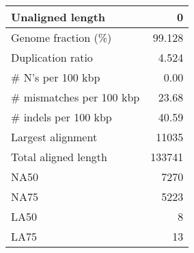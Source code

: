 \documentclass[12pt,a4paper]{article}
\begin{document}
\begin{table}[ht]
\begin{center}
\begin{tabular}{|l*{1}{|r}|}
Unaligned length & 0 \\ \hline
Genome fraction (\%) & 99.128 \\ \hline
Duplication ratio & 4.524 \\ \hline
\# N's per 100 kbp & 0.00 \\ \hline
\# mismatches per 100 kbp & 23.68 \\ \hline
\# indels per 100 kbp & 40.59 \\ \hline
Largest alignment & 11035 \\ \hline
Total aligned length & 133741 \\ \hline
NA50 & 7270 \\ \hline
NA75 & 5223 \\ \hline
LA50 & 8 \\ \hline
LA75 & 13 \\ \hline
\end{tabular}
\end{center}
\end{table}
\end{document}

